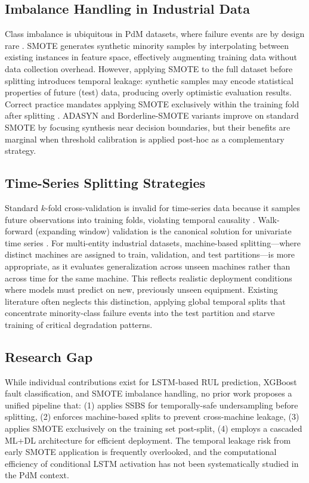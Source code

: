 \documentclass[conference]{IEEEtran}
\begin{document}
\subsection{Imbalance Handling in Industrial Data}
Class imbalance is ubiquitous in PdM datasets, where failure events are by design rare \cite{li2020pdmimbalance}. SMOTE \cite{chawla2002smote} generates synthetic minority samples by interpolating between existing instances in feature space, effectively augmenting training data without data collection overhead. However, applying SMOTE to the full dataset before splitting introduces temporal leakage: synthetic samples may encode statistical properties of future (test) data, producing overly optimistic evaluation results. Correct practice mandates applying SMOTE exclusively within the training fold after splitting \cite{blagus2013smote_bias}. ADASYN and Borderline-SMOTE variants improve on standard SMOTE by focusing synthesis near decision boundaries, but their benefits are marginal when threshold calibration is applied post-hoc as a complementary strategy.

\subsection{Time-Series Splitting Strategies}
Standard $k$-fold cross-validation is invalid for time-series data because it samples future observations into training folds, violating temporal causality \cite{bergmeir2018tscv}. Walk-forward (expanding window) validation is the canonical solution for univariate time series \cite{hyndman2018forecasting}. For multi-entity industrial datasets, machine-based splitting—where distinct machines are assigned to train, validation, and test partitions—is more appropriate, as it evaluates generalization across unseen machines rather than across time for the same machine. This reflects realistic deployment conditions where models must predict on new, previously unseen equipment. Existing literature often neglects this distinction, applying global temporal splits that concentrate minority-class failure events into the test partition and starve training of critical degradation patterns.

\subsection{Research Gap}
While individual contributions exist for LSTM-based RUL prediction, XGBoost fault classification, and SMOTE imbalance handling, no prior work proposes a unified pipeline that: (1) applies SSBS for temporally-safe undersampling before splitting, (2) enforces machine-based splits to prevent cross-machine leakage, (3) applies SMOTE exclusively on the training set post-split, (4) employs a cascaded ML+DL architecture for efficient deployment. The temporal leakage risk from early SMOTE application is frequently overlooked, and the computational efficiency of conditional LSTM activation has not been systematically studied in the PdM context.
\end{document}
